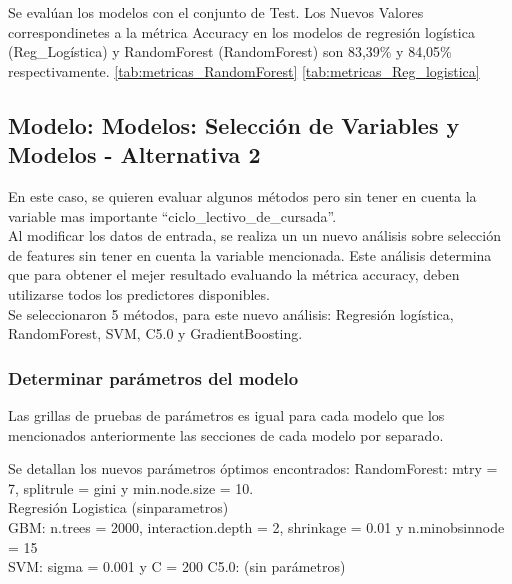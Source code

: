 Se evalúan los modelos con el conjunto de Test.
Los Nuevos Valores correspondinetes a la métrica Accuracy en los modelos de regresión logística (Reg\_Logística) y RandomForest (RandomForest) son 83,39\% y 84,05\% respectivamente. \ref{tab:metricas_RandomForest} \ref{tab:metricas_Reg_logistica}

\subsection{Modelo: Modelos: Selección de Variables y Modelos - Alternativa 2}

En este caso, se quieren evaluar algunos métodos pero sin tener en cuenta la variable mas importante ``ciclo\_lectivo\_de\_cursada''.\\
Al modificar los datos de entrada, se realiza un un nuevo análisis sobre selección de features sin tener en cuenta la variable mencionada. Este análisis determina que para obtener el mejer resultado evaluando la métrica accuracy, deben utilizarse todos los predictores disponibles. \\


Se seleccionaron 5 métodos, para este nuevo análisis: Regresión logística, RandomForest, SVM, C5.0 y GradientBoosting.


\subsubsection{Determinar parámetros del modelo}

Las grillas de pruebas de parámetros es igual para cada modelo que los
mencionados anteriormente las secciones de cada modelo por separado.

Se detallan los nuevos parámetros óptimos encontrados: 
RandomForest: mtry = 7, splitrule = gini y min.node.size = 10.
\\
Regresión Logistica (sinparametros)\\
GBM: n.trees = 2000, interaction.depth = 2, shrinkage = 0.01
y n.minobsinnode = 15\\
SVM: sigma = 0.001 y C = 200
C5.0: (sin parámetros)


